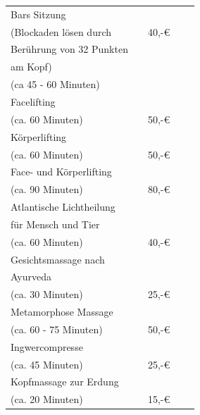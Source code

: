 \documentclass[foldmark,10pt,a4paper,notumble]{leaflet}
\begin{document}
 \begin{tabular}{p{40mm}llcc}\hline\hline
Bars Sitzung              &     &  \\
(Blockaden lösen durch & & 40,-€ \\
Berührung von 32 Punkten & & \\
am Kopf) & & \\
(ca 45 - 60 Minuten)  &   &  \\
\hline
Facelifting   &   &  \\
(ca. 60 Minuten) & & 50,-€\\
\hline
Körperlifting   &   &  \\
(ca. 60 Minuten) & & 50,-€\\
\hline
Face- und Körperlifting   &   &  \\
(ca. 90 Minuten) & & 80,-€\\
 \hline
Atlantische Lichtheilung   &   &  \\
für Mensch und Tier & & \\
(ca. 60 Minuten) & & 40,-€ \\
\hline
Gesichtsmassage nach  &   &  \\
Ayurveda & & \\
(ca. 30 Minuten) & & 25,-€ \\
\hline
Metamorphose Massage  &   &  \\
(ca. 60 - 75 Minuten) & & 50,-€ \\
\hline
Ingwercompresse  &   &  \\
(ca. 45 Minuten) & & 25,-€ \\
\hline
Kopfmassage zur Erdung  &   &  \\
(ca. 20 Minuten) & & 15,-€ \\
\hline
\end{tabular}



\newpage
\end{document}
